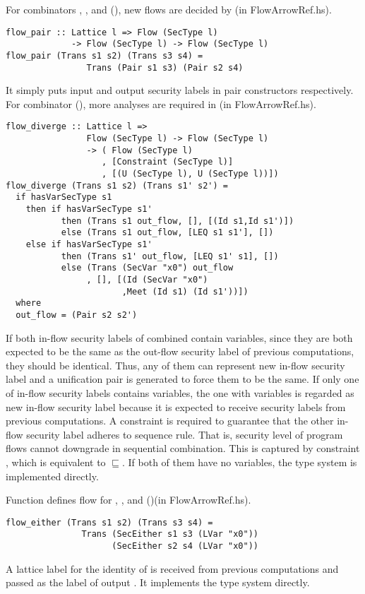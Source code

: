 For combinators , , and (\arrowop{*}), new flows are decided by 
(in FlowArrowRef.hs). 
\begin{verbatim}
flow_pair :: Lattice l => Flow (SecType l) 
             -> Flow (SecType l) -> Flow (SecType l)
flow_pair (Trans s1 s2) (Trans s3 s4) = 
                Trans (Pair s1 s3) (Pair s2 s4)
\end{verbatim}
It simply puts input and output security labels in pair constructors respectively.
For combinator (\arrowop{\&}), more analyses are required 
in (in FlowArrowRef.hs).
\begin{verbatim}
flow_diverge :: Lattice l => 
                Flow (SecType l) -> Flow (SecType l)
                -> ( Flow (SecType l)
                   , [Constraint (SecType l)] 
                   , [(U (SecType l), U (SecType l))])
flow_diverge (Trans s1 s2) (Trans s1' s2') =
  if hasVarSecType s1
    then if hasVarSecType s1'
           then (Trans s1 out_flow, [], [(Id s1,Id s1')])
           else (Trans s1 out_flow, [LEQ s1 s1'], [])
    else if hasVarSecType s1'
           then (Trans s1' out_flow, [LEQ s1' s1], [])
           else (Trans (SecVar "x0") out_flow
                , [], [(Id (SecVar "x0")
                       ,Meet (Id s1) (Id s1'))])
  where
  out_flow = (Pair s2 s2')
\end{verbatim}
If both in-flow security labels of combined  contain variables, since they are both expected 
to be the same as the out-flow security label of previous computations, they should be identical. Thus, any of 
them can represent new in-flow security label and a unification pair is generated to force them to be the same.
If only one of in-flow security labels contains variables, the one with variables is regarded as new 
in-flow security label because it is expected to receive security labels from previous computations.
A constraint is required to guarantee that the other in-flow security label adheres to
sequence rule. That is, security level of program flows cannot downgrade in sequential combination. 
This is captured by constraint , which is equivalent to $\sqsubseteq$. 
If both of them have no variables, the type system is implemented directly.

Function  defines
flow for , , and (\arrowop{+})(in FlowArrowRef.hs).
\begin{verbatim}
flow_either (Trans s1 s2) (Trans s3 s4) = 
               Trans (SecEither s1 s3 (LVar "x0")) 
                     (SecEither s2 s4 (LVar "x0"))
\end{verbatim}
A lattice label for the identity of  is received from previous computations and passed
as the label of output . It implements the type system directly.

